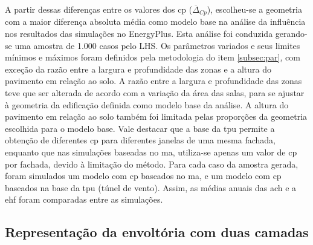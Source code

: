 \documentclass[brazil,hardcopy,openany]{ufscthesis} %
\newcommand{\figsize}{.6}
\begin{document}
A partir dessas diferenças entre os valores dos \acrshort{cp} ($\overline{\Delta}_{Cp}$), escolheu-se a geometria com a maior diferença absoluta média como modelo base na análise da influência nos resultados das simulações no EnergyPlus.
Esta análise foi conduzida gerando-se uma amostra de 1.000 casos pelo LHS.
Os parâmetros variados e seus limites mínimos e máximos foram definidos pela metodologia do item \ref{subsec:par}, com exceção da razão entre a largura e profundidade das zonas e a altura do pavimento em relação ao solo.
A razão entre a largura e profundidade das zonas teve que ser alterada de acordo com a variação da área das salas, para se ajustar à geometria da edificação definida como modelo base da análise.
A altura do pavimento em relação ao solo também foi limitada pelas proporções da geometria escolhida para o modelo base.
Vale destacar que a base da \acrshort{tpu} permite a obtenção de diferentes \acrshort{cp} para diferentes janelas de uma mesma fachada, enquanto que nas simulações baseadas no \acrlong{ma}, utiliza-se apenas um valor de \acrshort{cp} por fachada, devido à limitação do método. 
Para cada caso da amostra gerada, foram simulados um modelo com \acrshort{cp} baseados no \acrlong{ma}, e um modelo com \acrshort{cp} baseados na base da \acrshort{tpu} (túnel de vento).
Assim, as médias anuais das \acrfull{ach} e a \acrshort{ehf} foram comparadas entre as simulações.

%		

\subsection*{Representação da envoltória com duas camadas}
\end{document}
